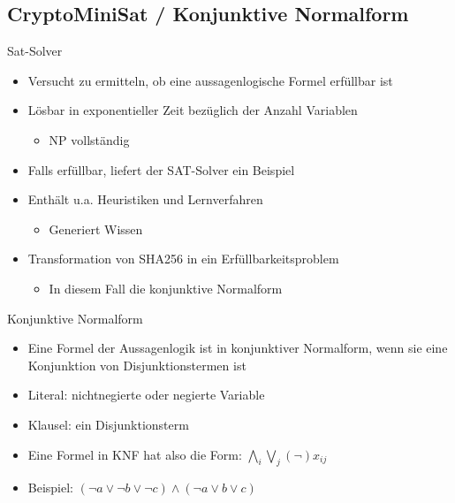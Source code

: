 \documentclass{beamer}
\begin{document}
  \subsection{CryptoMiniSat / Konjunktive Normalform}
    \begin{frame}{Sat-Solver}
      \begin{itemize}
        \setlength{\itemsep}{12pt}
        \item Versucht zu ermitteln, ob eine aussagenlogische Formel erfüllbar ist
        \item Lösbar in exponentieller Zeit bezüglich der Anzahl Variablen
        \begin{itemize}
          \item NP vollständig
        \end{itemize}
        \item Falls erfüllbar, liefert der SAT-Solver ein Beispiel
        \item Enthält u.a. Heuristiken und Lernverfahren
        \begin{itemize}
         \item Generiert Wissen
        \end{itemize}
        \item Transformation von SHA256 in ein Erfüllbarkeitsproblem
        \begin{itemize}
         \item In diesem Fall die konjunktive Normalform
        \end{itemize}
      \end{itemize}
    \end{frame}
    \begin{frame}{Konjunktive Normalform}
      \begin{itemize}
        \setlength{\itemsep}{16pt}
        \item Eine Formel der Aussagenlogik ist in konjunktiver Normalform, wenn sie eine Konjunktion von Disjunktionstermen ist
        \item Literal: nichtnegierte oder negierte Variable
        \item Klausel: ein Disjunktionsterm
        \item Eine Formel in KNF hat also die Form: \newline \newline $ \bigwedge\limits_{i} \bigvee\limits_{j} (\neg)x_{ij} $
        \item Beispiel: $ (\neg a \vee \neg b \vee \neg c) \wedge (\neg a \vee b \vee c) $
      \end{itemize}
    \end{frame}
\end{document}

